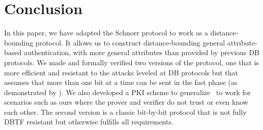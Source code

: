 \section{Conclusion}%
\label{Conclusion}

In this paper, we have adapted the Schnorr protocol to work as a
distance-bounding protocol.  It allows us to construct distance-bounding
general attribute-based authentication, with more general attributes than
provided by previous \ac{DB} protocols.  We made and formally verified two versions of the
protocol, one that is more efficient and resistant to the attacks
leveled at \ac{DB} protocols but that assumes that more than one
bit at a time can be sent in the fast phase (as demonstrated by
\textcite{UWBPR}). We also developed a PKI scheme to generalize~\cite{UWBPR} to work for scenarios such as ours where the prover and verifier do
not trust or even know each other. The second version is a classic bit-by-bit
protocol that is not fully \ac{DBTF} resistant but otherwise fulfills
all requirements. 

